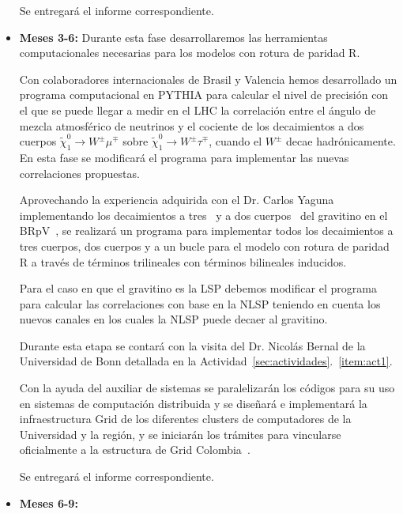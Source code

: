 \begin{bbrpvlhc}
\begin{itemize}
  Se entregará el informe correspondiente.
\item \textbf{Meses 3-6:} Durante esta fase desarrollaremos las
  herramientas computacionales necesarias para los modelos con rotura
  de paridad R.

\begin{brpvlhc}
  Con colaboradores internacionales de Brasil y Valencia hemos desarrollado un
  programa computacional en PYTHIA para calcular el nivel de precisión
  con el que se puede llegar a medir en el LHC la correlación entre el
  ángulo de mezcla atmosférico de neutrinos y el cociente de los decaimientos
  a dos cuerpos $\tilde\chi_1^0\to W^\pm\mu^\mp$ sobre
  $\tilde\chi_1^0\to W^\pm\tau^\mp$, cuando el $W^\pm$ decae
  hadrónicamente.  En esta fase se modificará el programa para
  implementar las nuevas correlaciones propuestas.
\end{brpvlhc}

\begin{gravitinodm}
  Aprovechando la experiencia adquirida con el Dr. Carlos Yaguna
  implementando los decaimientos a tres~\cite{Choi:2010xn,Choi:2010jt}
  y a dos cuerpos~\cite{Restrepo:2011rj} del gravitino en el
  BRpV~\cite{Choi:2010xn,Choi:2010jt}, se realizará un programa para
  implementar todos los decaimientos a tres cuerpos, dos cuerpos y a
  un bucle para el modelo con rotura de paridad R a través de
  términos trilineales con términos bilineales inducidos.

  Para el caso en que el gravitino es la LSP debemos modificar el
  programa para calcular las correlaciones con base en la NLSP
  teniendo en cuenta los nuevos canales en los cuales la NLSP puede
  decaer al gravitino.

  Durante esta etapa se contará con la visita del Dr. Nicolás Bernal
  de la Universidad de Bonn detallada en la
  Actividad~\ref{sec:actividades}.~\ref{item:act1}. 

  Con la ayuda del auxiliar de sistemas se paralelizarán los códigos
  para su uso en sistemas de computación distribuida y se diseñará e
  implementará la infraestructura Grid de los diferentes clusters de
  computadores de la Universidad y la región, y se iniciarán los
  trámites para vincularse oficialmente a la estructura de Grid
  Colombia~\cite{gridcolombia}.

  Se entregará el informe correspondiente.
\end{gravitinodm}

\item \textbf{Meses 6-9:}


\end{itemize}
\end{bbrpvlhc}
